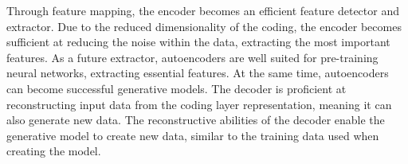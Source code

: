 Through feature mapping, the encoder becomes an efficient feature detector and extractor.
Due to the reduced dimensionality of the coding, the encoder becomes sufficient at reducing the noise within the data, extracting the most important features.
As a future extractor, autoencoders are well suited for pre-training neural networks, extracting essential features.
At the same time, autoencoders can become successful generative models.
The decoder is proficient at reconstructing input data from the coding layer representation, meaning it can also generate new data.
The reconstructive abilities of the decoder enable the generative model to create new data, similar to the training data used when creating the model.
\cite[p.~506-508]{Geron2017}

